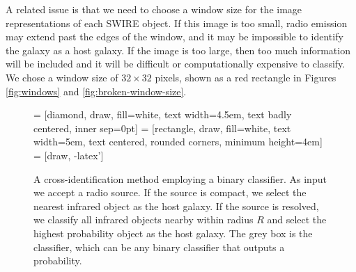 \documentclass[fleqn,usenatbib,usedcolumn]{mnras}
\begin{document}
    A related issue is that we need to choose a window size for the image
    representations of each SWIRE object. If this image is too small, radio
    emission may extend past the edges of the window, and it may be impossible
    to identify the galaxy as a host galaxy. If the image is too large, then
    too much information will be included and it will be difficult or
    computationally expensive to classify. We chose a window size of $32
    \times 32$ pixels, shown as a red rectangle in Figures
    \ref{fig:windows} and \ref{fig:broken-window-size}.

    \begin{figure}
      \centering
       = [diamond, draw, fill=white, 
          text width=4.5em, text badly centered, inner sep=0pt]
       = [rectangle, draw, fill=white, 
          text width=5em, text centered, rounded corners, minimum height=4em]
       = [draw, -latex']
      \caption{A cross-identification method employing a binary classifier. As
        input we accept a radio source. If the source is compact, we select
        the nearest infrared object as the host galaxy. If the source is
        resolved, we classify all infrared objects nearby within radius $R$
        and select the highest probability object as the host galaxy. The grey
        box is the classifier, which can be any binary classifier that outputs
        a probability.}
      \label{fig:flowchart}
    \end{figure}
\end{document}

